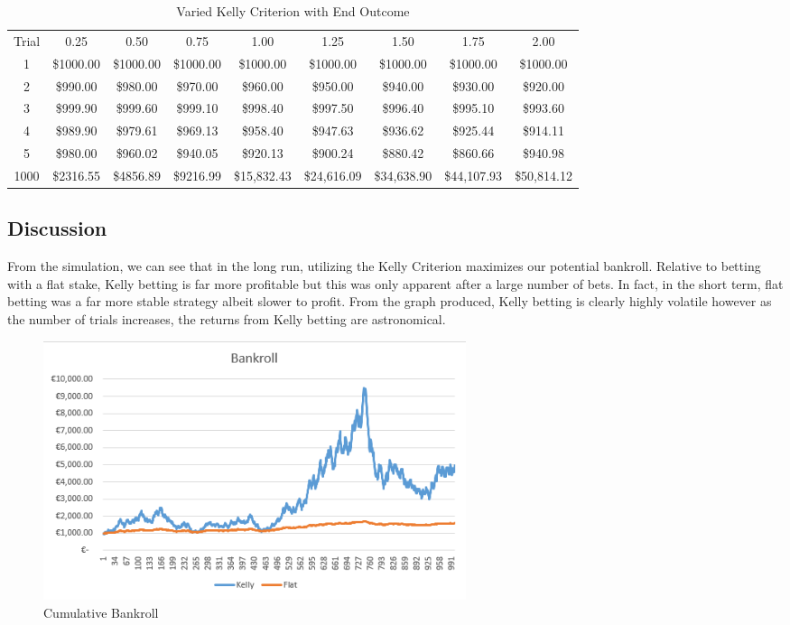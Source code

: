 \documentclass[12pt]{article}
\begin{document}
\begin{table}[H]
\centering
\begin{tabular}{ccccccccc}
Trial & 0.25      & 0.50      & 0.75      & 1.00        & 1.25        & 1.50        & 1.75        & 2.00        \\
1     & \$1000.00 & \$1000.00 & \$1000.00 & \$1000.00   & \$1000.00   & \$1000.00   & \$1000.00   & \$1000.00   \\
2     & \$990.00  & \$980.00  & \$970.00  & \$960.00    & \$950.00    & \$940.00    & \$930.00    & \$920.00    \\
3     & \$999.90  & \$999.60  & \$999.10  & \$998.40    & \$997.50    & \$996.40    & \$995.10    & \$993.60    \\
4     & \$989.90  & \$979.61  & \$969.13  & \$958.40    & \$947.63    & \$936.62    & \$925.44    & \$914.11    \\
5     & \$980.00  & \$960.02  & \$940.05  & \$920.13    & \$900.24    & \$880.42    & \$860.66    & \$940.98    \\
1000  & \$2316.55 & \$4856.89 & \$9216.99 & \$15,832.43 & \$24,616.09 & \$34,638.90 & \$44,107.93 & \$50,814.12
\end{tabular}
\caption{Varied Kelly Criterion with End Outcome}
\end{table}

\subsection{Discussion}
From the simulation, we can see that in the long run, utilizing the Kelly Criterion maximizes our potential bankroll. Relative to betting with a flat stake, Kelly betting is far more profitable but this was only apparent after a large number of bets. In fact, in the short term, flat betting was a far more stable strategy albeit slower to profit. From the graph produced, Kelly betting is clearly highly volatile\cite{thorp} however as the number of trials increases, the returns from Kelly betting are astronomical.\cite{thorp}

\begin{figure}[H]
\centering
\includegraphics[width=0.6\textwidth]{kelly_flat.PNG}
\caption{Cumulative Bankroll}
\end{figure}
\end{document}
